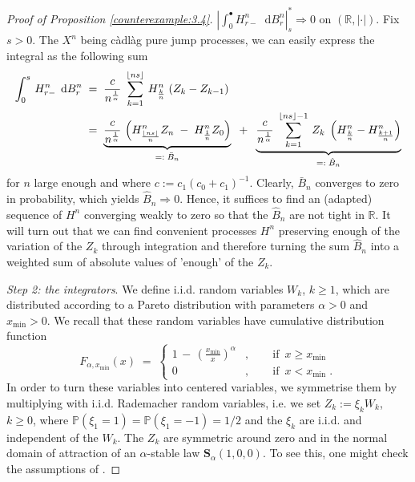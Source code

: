 \documentclass[11pt]{article}
\theoremstyle{definition}\newtheorem{example}[theorem]{Example}
\theoremstyle{definition}\newtheorem{counterexample}[theorem]{Counterexample}
\theoremstyle{definition}\newtheorem{remark}[theorem]{Remark}
\theoremstyle{definition}\newtheorem{defi}[theorem]{Definition}
\numberwithin{equation}{section}
\newcommand{\R}{\mathbb{R}}
\newcommand*\diff{\mathop{}\!\mathrm{d}}								%
\newcommand{\Pro}{\mathbb{P}}										%
\renewcommand{\|}{\; : \, \;}											%
\begin{document}
\begin{proof}[Proof of Proposition \ref{counterexample:3.4}]
	$|\int_0^\bullet H^n_{r-}  \diff B^n_r|^*_s \Rightarrow 0$ on $(\R, |\cdot|)$. Fix $s>0$. The $X^n$ being càdlàg pure jump processes, we can easily express the integral as the following sum
	\begin{align}
		\int_0^s \, H^n_{r-} \; \diff B^n_r \; &= \; \frac{c}{n^{\frac 1 \alpha}}\;  \sum_{k=1}^{\lfloor ns \rfloor} \, H^n_{\frac{k}{n}}\; ( Z_{k} - Z_{k-1}) \notag \\
		&= \; \underbrace{\frac{c}{n^{\frac 1 \alpha}}\, \left( H^n_{\frac{\lfloor n s\rfloor}{n}} Z_{n} \; - \; H^n_{\frac{1}{n}} Z_0\right)}_{=: \; \bar{B}_n}  \; \; + \; \; \underbrace{\frac{c}{n^{\frac 1 \alpha}}\;  \sum_{k=1}^{\lfloor ns \rfloor -1} \, Z_k \; \left( H^n_{\frac k n} - H^n_{\frac{k+1}{n}}\right)}_{=: \; \hat{B}_n} \label{eq:5.10}
	\end{align}
	for $n$ large enough and where $c:=c_1(c_0+c_1)^{-1}$. Clearly, $\bar{B}_n$ converges to zero in probability, which yields $\hat{B}_n \Rightarrow 0$. Hence, it suffices to find an (adapted) sequence of $H^n$ converging weakly to zero so that the $\hat{B}_n$ are not tight in $\R$. It will turn out that we can find convenient processes $H^n$ preserving enough of the variation of the $Z_k$ through integration and therefore turning the sum $\hat{B}_n$ into a weighted sum of absolute values of 'enough' of the $Z_k$.
	
	\phantom{ee} \emph{Step 2: the integrators}.
	We define i.i.d. random variables $W_k$, $k\ge 1$, which are distributed according to a Pareto distribution with parameters $\alpha>0$ and $x_{\text{min}}>0$. We recall that these random variables have cumulative distribution function
	$$F_{\alpha,x_{\text{min}}}(x) \; = \; 
	\begin{cases} 
		1\, - \, \left( \frac{x_{\text{min}}}{x} \right)^{\alpha} &, \qquad \text{if }\, x \ge x_{\text{min}} \\
		0&, \qquad \text{if }\, x< x_{\text{min}} \;.
	\end{cases}$$
	In order to turn these variables into centered variables, we symmetrise them by multiplying with i.i.d. Rademacher random variables, i.e. we set 
	$Z_k :=  \xi_k  W_k$, $k \ge 0$, where $\Pro(\xi_1=1)=\Pro(\xi_1=-1)=1/2$ and the $\xi_k$ are i.i.d. and independent of the $W_k$. The $Z_k$ are symmetric around zero and in the normal domain of attraction of an $\alpha$-stable law $\textbf{S}_\alpha(1, 0, 0)$. To see this, one might check the assumptions of \cite[Thm.~4.5.2]{whitt}.
	

\end{proof}
\end{document}
